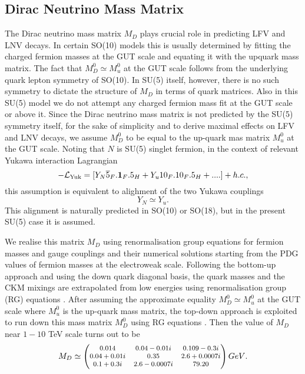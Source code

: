 \documentclass[a4paper,11pt]{article}
\newcommand{\be}{\begin{equation}}
\newcommand{\ee}{\end{equation}}
\newcommand{\bea}{\begin{eqnarray}}
\newcommand{\eea}{\end{eqnarray}}
\begin{document}
\subsection{Dirac Neutrino Mass Matrix}
The Dirac neutrino mass matrix $M_D$ plays crucial role in predicting
LFV and LNV decays. In certain SO(10) models
\cite{babu-rnm:1993,Joshipura,bpn-mkp:2015,ap:2012} this is usually determined by
fitting the charged fermion masses at the GUT scale and equating it with the upquark mass matrix. The fact that $M_D^0\simeq M_{u}^0$ at the GUT scale follows from the underlying quark lepton symmetry \cite{JCP:1974} of SO(10). In SU(5) itself, however, there is no
such symmetry to dictate the structure of $M_D$ in terms of quark matrices. Also
in this SU(5) model we do not attempt any charged fermion mass fit at the GUT
scale or above it. Since the Dirac neutrino mass matrix is not predicted by the SU(5) symmetry itself, for the sake of simplicity and to derive maximal effects on LFV and LNV decays, we  assume $M^0_D$ to be equal to the up-quark mas
matrix $M_u^0$ at the GUT
scale. Noting that $N$ is SU(5) singlet fermion, in the context of
relevant Yukawa interaction Lagrangian 
\be
-{\cal L}_{\rm Yuk}= [Y_{N}{\overline 5}_F.{\bf 1}_F.{5}_H + Y_{u} {10}_F.{10}_F.{5}_H+....]+h.c.,\label{eq:su5yuk}
\ee
this assumption is equivalent to alighment of the two Yukawa couplings
\be
Y_{N}\simeq Y_{u} . \label{eq:eqyuk}
\ee 
This alignment is naturally predicted in SO(10) or
SO(18)\cite{Wilczek-Valle}, but in the present SU(5) case it is assumed.

We realise this matrix $M_D$ using renormalisation group equations for fermion masses and gauge couplings and their numerical solutions \cite{dp:2001} starting from the PDG values \cite{PDG:2012,PDG:2014,PDG:2016} of fermion masses at the electroweak scale. 
Following the bottom-up approach and using the down quark diagonal basis, the quark masses and the CKM mixings are 
extrapolated from low energies using renormalisation group (RG) equations
\cite{dp:2001,Stella:2016}. After assuming the approximate equality $M^0_D\simeq M^0_u$ at the GUT scale where $M^0_u$ is the up-quark mass matrix,  the top-down approach is
exploited to run down this mass matrix $M^0_D$ using  RG equations
\cite{dp:2001}. Then
   the value of $M_D$ near $1-10$ TeV scale turns out to be  
\bea
M_D \simeq\footnotesize\begin{pmatrix}
0.014&0.04-0.01i&0.109-0.3i\\
0.04+0.01i&0.35&2.6+0.0007i\\
0.1+0.3i&2.6-0.0007i&79.20
\end{pmatrix}{GeV}.  \label{eq:mdmu}
\eea
\end{document}
